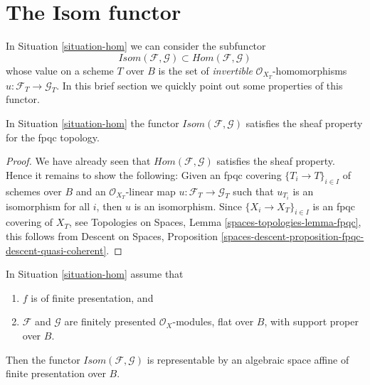 \section{The Isom functor}
\label{section-isom}

\noindent
In Situation \ref{situation-hom} we can consider the subfunctor
$$
\mathit{Isom}(\mathcal{F}, \mathcal{G}) \subset
\mathit{Hom}(\mathcal{F}, \mathcal{G})
$$
whose value on a scheme $T$ over $B$ is the set of {\it invertible}
$\mathcal{O}_{X_T}$-homomorphisms $u : \mathcal{F}_T \to \mathcal{G}_T$.
In this brief section we quickly point out some properties of this
functor.

\begin{lemma}
\label{lemma-isom-sheaf}
In Situation \ref{situation-hom} the functor
$\mathit{Isom}(\mathcal{F}, \mathcal{G})$ 
satisfies the sheaf property for the fpqc topology.
\end{lemma}

\begin{proof}
We have already seen that $\mathit{Hom}(\mathcal{F}, \mathcal{G})$
satisfies the sheaf property. Hence it remains to show the following:
Given an fpqc covering $\{T_i \to T\}_{i \in I}$ of schemes over $B$
and an $\mathcal{O}_{X_T}$-linear map
$u : \mathcal{F}_T \to \mathcal{G}_T$ such that
$u_{T_i}$ is an isomorphism for all $i$, then $u$ is an isomorphism.
Since $\{X_i \to X_T\}_{i \in I}$ is an fpqc covering of $X_T$, see
Topologies on Spaces, Lemma \ref{spaces-topologies-lemma-fpqc},
this follows from
Descent on Spaces, Proposition
\ref{spaces-descent-proposition-fpqc-descent-quasi-coherent}.
\end{proof}

\begin{proposition}
\label{proposition-isom}
In Situation \ref{situation-hom} assume that
\begin{enumerate}
\item $f$ is of finite presentation, and
\item $\mathcal{F}$ and $\mathcal{G}$ are finitely presented
$\mathcal{O}_X$-modules, flat over $B$, with support proper over $B$.
\end{enumerate}
Then the functor $\mathit{Isom}(\mathcal{F}, \mathcal{G})$ is
representable by an algebraic space affine of finite presentation
over $B$.
\end{proposition}

